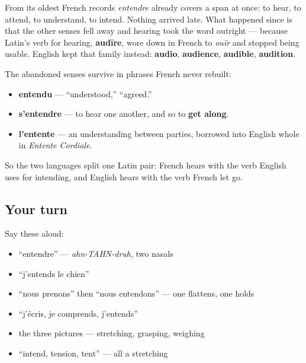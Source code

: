 \begin{culture}
From its oldest French records \emph{entendre} already covers a span at once: to hear, to attend, to understand, to intend. Nothing arrived late. What happened since is that the other senses fell away and hearing took the word outright — because Latin's verb for hearing, \textbf{audīre}, wore down in French to \emph{ouïr} and stopped being usable. English kept that family instead: \textbf{audio}, \textbf{audience}, \textbf{audible}, \textbf{audition}.

The abandoned senses survive in phrases French never rebuilt:

\begin{itemize}
\raggedright
  \item \textbf{entendu} — \textquotedblleft{}understood,\textquotedblright{} \textquotedblleft{}agreed.\textquotedblright{}
  \item \textbf{s'entendre} — to hear one another, and so to \textbf{get along}.
  \item \textbf{l'entente} — an understanding between parties, borrowed into English whole in \emph{Entente Cordiale}.
\end{itemize}

So the two languages split one Latin pair: French hears with the verb English uses for intending, and English hears with the verb French let go.
\end{culture}

\subsection*{Your turn}
Say these aloud:

\begin{itemize}
\raggedright
  \item \textquotedblleft{}entendre\textquotedblright{} — \emph{ahn-TAHN-druh}, two nasals
  \item \textquotedblleft{}j'entends le chien\textquotedblright{}
  \item \textquotedblleft{}nous prenons\textquotedblright{} then \textquotedblleft{}nous entendons\textquotedblright{} — one flattens, one holds
  \item \textquotedblleft{}j'écris, je comprends, j'entends\textquotedblright{}
  \item the three pictures — stretching, grasping, weighing
  \item \textquotedblleft{}intend, tension, tent\textquotedblright{} — all a stretching
\end{itemize}

